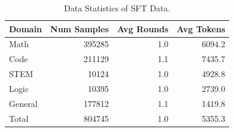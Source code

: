 \begin{table}[ht]
\centering
\caption{Data Statistics of SFT Data.}
\label{tab:800k}
\begin{tabular}{lrrr}
\toprule
{Domain} & {Num Samples} & {Avg Rounds} & {Avg Tokens} \\
\midrule
Math & 395285 & 1.0 & 6094.2 \\
Code & 211129 & 1.1 & 7435.7 \\
STEM & 10124 & 1.0 & 4928.8 \\
Logic & 10395 & 1.0 & 2739.0 \\
General & 177812 & 1.1 & 1419.8 \\
\midrule
Total & 804745 & 1.0 & 5355.3 \\
\bottomrule
\end{tabular}
\end{table}